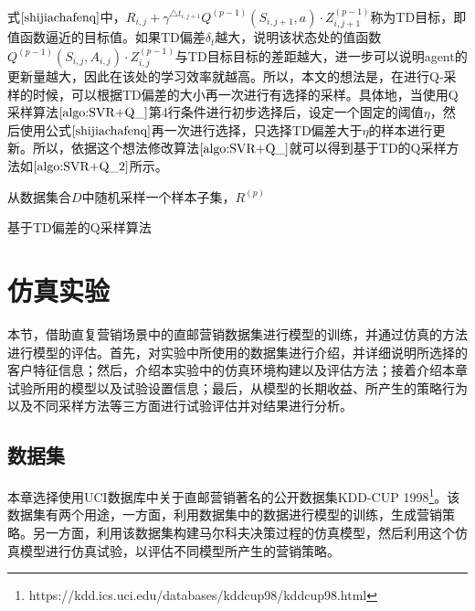 式$\eqref{shijiachafenq}$中，$R_{i,j} + \gamma^{\triangle t_{i,j+1}} Q^{(p-1)}(S_{i,j+1}, a) \cdot Z_{i,j+1}^{(p-1)}$称为TD目标，即值函数逼近的目标值。如果TD偏差$\delta_{t}$越大，说明该状态处的值函数$Q^{(p-1)}(S_{i,j},A_{i,j}) \cdot Z_{i,j}^{(p-1)}$与TD目标目标的差距越大，进一步可以说明agent的更新量越大，因此在该处的学习效率就越高。所以，本文的想法是，在进行Q-采样的时候，可以根据TD偏差的大小再一次进行有选择的采样。具体地，当使用Q采样算法$\ref{algo:SVR+Q_}$第4行条件进行初步选择后，设定一个固定的阈值$\eta$，然后使用公式$\eqref{shijiachafenq}$再一次进行选择，只选择TD偏差大于$\eta$的样本进行更新。所以，依据这个想法修改算法$\ref{algo:SVR+Q_}$就可以得到基于TD的Q采样方法如$\ref{algo:SVR+Q_2}$所示。

\begin{algorithm}[htbp]
\small
\SetAlgoLined
{}
从数据集合$D$中随机采样一个样本子集，$R^{(p)}$\;
\caption{基于TD偏差的Q采样算法}
\label{algo:SVR+Q_2}
\end{algorithm}

\section{仿真实验}
本节，借助直复营销场景中的直邮营销数据集进行模型的训练，并通过仿真的方法进行模型的评估。首先，对实验中所使用的数据集进行介绍，并详细说明所选择的客户特征信息；然后，介绍本实验中的仿真环境构建以及评估方法；接着介绍本章试验所用的模型以及试验设置信息；最后，从模型的长期收益、所产生的策略行为以及不同采样方法等三方面进行试验评估并对结果进行分析。

\subsection{数据集}
本章选择使用UCI数据库中关于直邮营销著名的公开数据集KDD-CUP 1998\footnote{https://kdd.ics.uci.edu/databases/kddcup98/kddcup98.html}。该数据集有两个用途，一方面，利用数据集中的数据进行模型的训练，生成营销策略。另一方面，利用该数据集构建马尔科夫决策过程的仿真模型，然后利用这个仿真模型进行仿真试验，以评估不同模型所产生的营销策略。

